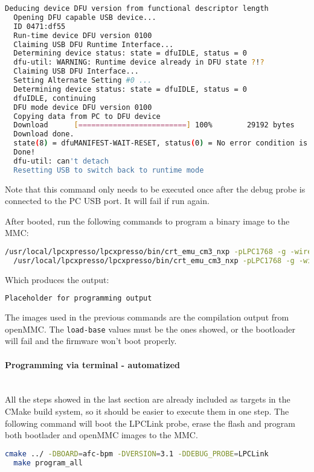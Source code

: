 \documentclass[letterpaper,12pt, titlepage]{article}
\newcommand{\newparagraph}[1]{\paragraph{#1}\mbox{}\\}
\begin{document}
\begin{lstlisting}[language=bash]
  Deducing device DFU version from functional descriptor length
  Opening DFU capable USB device...
  ID 0471:df55
  Run-time device DFU version 0100
  Claiming USB DFU Runtime Interface...
  Determining device status: state = dfuIDLE, status = 0
  dfu-util: WARNING: Runtime device already in DFU state ?!?
  Claiming USB DFU Interface...
  Setting Alternate Setting #0 ...
  Determining device status: state = dfuIDLE, status = 0
  dfuIDLE, continuing
  DFU mode device DFU version 0100
  Copying data from PC to DFU device
  Download      [=========================] 100%        29192 bytes
  Download done.
  state(8) = dfuMANIFEST-WAIT-RESET, status(0) = No error condition is present
  Done!
  dfu-util: can't detach
  Resetting USB to switch back to runtime mode
\end{lstlisting}

Note that this command only needs to be executed once after the debug probe is connected to the PC USB port. It will fail if run again.

After booted, run the following commands to program a binary image to the MMC:

\begin{lstlisting}[language=bash]
  /usr/local/lpcxpresso/lpcxpresso/bin/crt_emu_cm3_nxp -pLPC1768 -g -wire=winusb -load-base=0 -flash-load-exec=bootloader.bin
  /usr/local/lpcxpresso/lpcxpresso/bin/crt_emu_cm3_nxp -pLPC1768 -g -wire=winusb -load-base=0x2000 -flash-load-exec=openMMC.bin
\end{lstlisting}

Which produces the output:

\begin{lstlisting}[language=bash]
  Placeholder for programming output
\end{lstlisting}

The images used in the previous commands are the compilation output from openMMC. The \texttt{load-base} values must be the ones showed, or the bootloader will fail and the firmware won't boot properly.

\newparagraph{Programming via terminal - automatized}
All the steps showed in the last section are already included as targets in the CMake build system, so it should be easier to execute them in one step. The following command will boot the LPCLink probe, erase the flash and program both bootlader and openMMC images to the MMC.

\begin{lstlisting}[language=bash]
  cmake ../ -DBOARD=afc-bpm -DVERSION=3.1 -DDEBUG_PROBE=LPCLink
  make program_all
\end{lstlisting}
\end{document}
